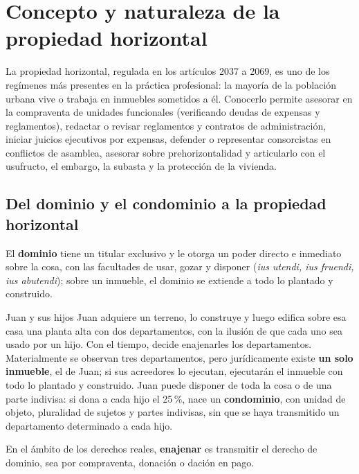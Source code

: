 \documentclass[12pt,oneside]{book}
\begin{document}
\chapter[Concepto y naturaleza de la propiedad horizontal]{Concepto y naturaleza de la propiedad horizontal}\label{cap:ph}

La propiedad horizontal, regulada en los artículos 2037 a 2069, es uno de los regímenes más presentes en la práctica profesional: la mayoría de la población urbana vive o trabaja en inmuebles sometidos a él. Conocerlo permite asesorar en la compraventa de unidades funcionales (verificando deudas de expensas y reglamentos), redactar o revisar reglamentos y contratos de administración, iniciar juicios ejecutivos por expensas, defender o representar consorcistas en conflictos de asamblea, asesorar sobre prehorizontalidad y articularlo con el usufructo, el embargo, la subasta y la protección de la vivienda.

\section{Del dominio y el condominio a la propiedad horizontal}

El \textbf{dominio} tiene un titular exclusivo y le otorga un poder directo e inmediato sobre la cosa, con las facultades de usar, gozar y disponer (\textit{ius utendi, ius fruendi, ius abutendi}); sobre un inmueble, el dominio se extiende a todo lo plantado y construido.

\begin{ejemplo}{Juan y sus hijos}
Juan adquiere un terreno, lo construye y luego edifica sobre esa casa una planta alta con dos departamentos, con la ilusión de que cada uno sea usado por un hijo. Con el tiempo, decide enajenarles los departamentos. Materialmente se observan tres departamentos, pero jurídicamente existe \textbf{un solo inmueble}, el de Juan; si sus acreedores lo ejecutan, ejecutarán el inmueble con todo lo plantado y construido. Juan puede disponer de toda la cosa o de una parte indivisa: si dona a cada hijo el 25\,\%, nace un \textbf{condominio}, con unidad de objeto, pluralidad de sujetos y partes indivisas, sin que se haya transmitido un departamento determinado a cada hijo.
\end{ejemplo}

En el ámbito de los derechos reales, \textbf{enajenar} es transmitir el derecho de dominio, sea por compraventa, donación o dación en pago.
\end{document}
